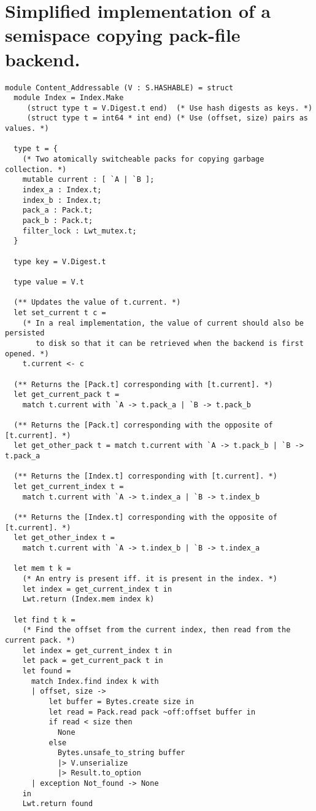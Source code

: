 \section{Simplified implementation of a semispace copying pack-file backend.}
\label{app:pack-copying}

\begin{verbatim}
module Content_Addressable (V : S.HASHABLE) = struct
  module Index = Index.Make
     (struct type t = V.Digest.t end)  (* Use hash digests as keys. *)
     (struct type t = int64 * int end) (* Use (offset, size) pairs as values. *)

  type t = {
    (* Two atomically switcheable packs for copying garbage collection. *)
    mutable current : [ `A | `B ];
    index_a : Index.t;
    index_b : Index.t;
    pack_a : Pack.t;
    pack_b : Pack.t;
    filter_lock : Lwt_mutex.t;
  }

  type key = V.Digest.t

  type value = V.t

  (** Updates the value of t.current. *)
  let set_current t c =
    (* In a real implementation, the value of current should also be persisted
       to disk so that it can be retrieved when the backend is first opened. *)
    t.current <- c

  (** Returns the [Pack.t] corresponding with [t.current]. *)
  let get_current_pack t =
    match t.current with `A -> t.pack_a | `B -> t.pack_b

  (** Returns the [Pack.t] corresponding with the opposite of [t.current]. *)
  let get_other_pack t = match t.current with `A -> t.pack_b | `B -> t.pack_a

  (** Returns the [Index.t] corresponding with [t.current]. *)
  let get_current_index t =
    match t.current with `A -> t.index_a | `B -> t.index_b

  (** Returns the [Index.t] corresponding with the opposite of [t.current]. *)
  let get_other_index t =
    match t.current with `A -> t.index_b | `B -> t.index_a

  let mem t k =
    (* An entry is present iff. it is present in the index. *)
    let index = get_current_index t in
    Lwt.return (Index.mem index k)

  let find t k =
    (* Find the offset from the current index, then read from the current pack. *)
    let index = get_current_index t in
    let pack = get_current_pack t in
    let found =
      match Index.find index k with
      | offset, size ->
          let buffer = Bytes.create size in
          let read = Pack.read pack ~off:offset buffer in
          if read < size then
            None
          else
            Bytes.unsafe_to_string buffer
            |> V.unserialize
            |> Result.to_option
      | exception Not_found -> None
    in
    Lwt.return found


\end{verbatim}
